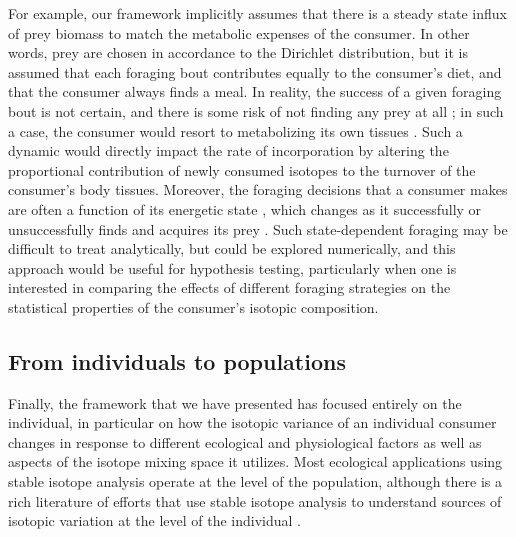 \documentclass{article}
\begin{document}
For example, our framework implicitly assumes that there is a steady state influx of prey biomass to match the metabolic expenses of the consumer.
In other words, prey are chosen in accordance to the Dirichlet distribution, but it is assumed that each foraging bout contributes equally to the consumer's diet, and that the consumer always finds a meal.
In reality, the success of a given foraging bout is not certain, and there is some risk of not finding any prey at all \citep{Creel:2008p838}; in such a case, the consumer would resort to metabolizing its own tissues \citep{Doucett:1999bz,VanderZanden:2001p2449}.
Such a dynamic would directly impact the rate of incorporation by altering the proportional contribution of newly consumed isotopes to the turnover of the consumer's body tissues.
Moreover, the foraging decisions that a consumer makes are often a function of its energetic state \citep{Barnett:2007er,Yeakel:2013hi}, which changes as it successfully or unsuccessfully finds and acquires its prey \citep{Mangel:1986um}.
Such state-dependent foraging may be difficult to treat analytically, but could be explored numerically, and this approach would be useful for hypothesis testing, particularly when one is interested in comparing the effects of different foraging strategies on the statistical properties of the consumer's isotopic composition.




\subsection*{From individuals to populations}
Finally, the framework that we have presented has focused entirely on the individual, in particular on how the isotopic variance of an individual consumer changes in response to different ecological and physiological factors as well as aspects of the isotope mixing space it utilizes.
Most ecological applications using stable isotope analysis operate at the level of the population, although there is a rich literature of efforts that use stable isotope analysis to understand sources of isotopic variation at the level of the individual \citep{Koch:1995vj,Matthews:2004hw,Sponheimer:2006fj,Post:2008ki,Newsome:2009tn,Yeakel:2009hz,Newsome:WhhVfocb,Hopkins:2015ip}.
\end{document}
